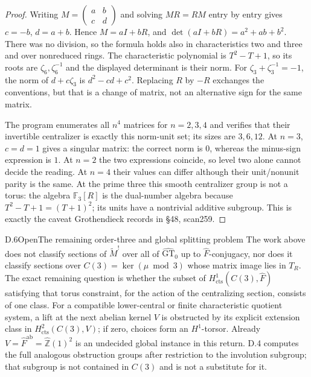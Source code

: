 \begin{proof}
Writing $M=\left(\begin{smallmatrix}a&b\\c&d\end{smallmatrix}\right)$ and solving $MR=RM$ entry by entry gives $c=-b$, $d=a+b$. Hence $M=aI+bR$, and
$\det(aI+bR)=a^2+ab+b^2$.
There was no division, so the formula holds also in characteristics two and three and over nonreduced rings. The characteristic polynomial is $T^2-T+1$, so its roots are $\zeta_6,\zeta_6^{-1}$ and the displayed determinant is their norm. For $\zeta_3+\zeta_3^{-1}=-1$, the norm of $d+c\zeta_3$ is $d^2-cd+c^2$. Replacing $R$ by $-R$ exchanges the conventions, but that is a change of matrix, not an alternative sign for the same matrix.

The program enumerates all $n^4$ matrices for $n=2,3,4$ and verifies that their invertible centralizer is exactly this norm-unit set; its sizes are $3,6,12$. At $n=3$, $c=d=1$ gives a singular matrix: the correct norm is $0$, whereas the minus-sign expression is $1$. At $n=2$ the two expressions coincide, so level two alone cannot decide the reading. At $n=4$ their values can differ although their unit/nonunit parity is the same. At the prime three this smooth centralizer group is not a torus: the algebra $\mathbb F_3[R]$ is the dual-number algebra because $T^2-T+1=(T+1)^2$; its units have a nontrivial additive subgroup. This is exactly the caveat Grothendieck records in \S48, scan259.
\end{proof}

\begin{claim}{D.6}{Open}{The remaining order-three and global splitting problem}
The work above does not classify sections of $\widetilde M^!$ over all of $\widehat{\mathrm{GT}}_0$ up to $\widehat F$-conjugacy, nor does it classify sections over $C(3)=\ker(\mu\bmod3)$ whose matrix image lies in $T_R$. The exact remaining question is whether the subset of
$H^1_{\mathrm{cts}}(C(3),\widehat F)$ satisfying that torus constraint, for the action of the centralizing section, consists of one class. For a compatible lower-central or finite characteristic quotient system, a lift at the next abelian kernel $V$ is obstructed by its explicit extension class in $H^2_{\mathrm{cts}}(C(3),V)$; if zero, choices form an $H^1$-torsor. Already $V=\widehat F^{\mathrm{ab}}=\widehat{\mathbb Z}(1)^2$ is an undecided global instance in this return. D.4 computes the full analogous obstruction groups after restriction to the involution subgroup; that subgroup is not contained in $C(3)$ and is not a substitute for it.
\end{claim}

